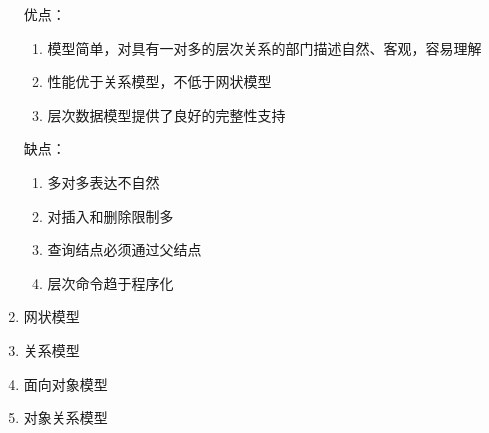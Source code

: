 \documentclass{article}
\begin{document}
\begin{enumerate}
    优点：

    \begin{enumerate}
        \item 模型简单，对具有一对多的层次关系的部门描述自然、客观，容易理解
        \item 性能优于关系模型，不低于网状模型
        \item 层次数据模型提供了良好的完整性支持
    \end{enumerate}

    缺点：

    \begin{enumerate}
        \item 多对多表达不自然
        \item 对插入和删除限制多
        \item 查询结点必须通过父结点
        \item 层次命令趋于程序化
    \end{enumerate}

    \item 网状模型
    \item 关系模型
    \item 面向对象模型
    \item 对象关系模型
\end{enumerate}
\end{document}
